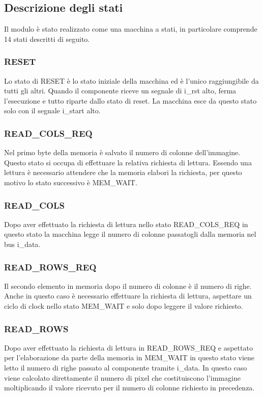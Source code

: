 \documentclass{article}
\begin{document}
\pagebreak

\subsection{Descrizione degli stati}
Il modulo è stato realizzato come una macchina a stati, in particolare comprende 14 stati descritti di seguito.

\subsubsection{RESET}
Lo stato di RESET è lo stato iniziale della macchina ed è l'unico raggiungibile da tutti gli altri. Quando il componente riceve un segnale di i\_rst alto, ferma l'esecuzione e tutto riparte dallo stato di reset. La macchina esce da questo stato solo con il segnale i\_start alto.

\subsubsection{READ\_COLS\_REQ}
Nel primo byte della memoria è salvato il numero di colonne dell'immagine. Questo stato si occupa di effettuare la relativa richiesta di lettura. Essendo una lettura è necessario attendere che la memoria elabori la richiesta, per questo motivo lo stato successivo è MEM\_WAIT.

\subsubsection{READ\_COLS}
Dopo aver effettuato la richiesta di lettura nello stato READ\_COLS\_REQ in questo stato la macchina legge il numero di colonne passatogli dalla memoria nel bus i\_data.

\subsubsection{READ\_ROWS\_REQ}
Il secondo elemento in memoria dopo il numero di colonne è il numero di righe. Anche in questo caso è necessario effettuare la richiesta di lettura, aspettare un ciclo di clock nello stato MEM\_WAIT e solo dopo leggere il valore richiesto.

\subsubsection{READ\_ROWS}
Dopo aver effettuato la richiesta di lettura in READ\_ROWS\_REQ e aspettato per l'elaborazione da parte della memoria in MEM\_WAIT in questo stato viene letto il numero di righe passato al componente tramite i\_data. In questo caso viene calcolato direttamente il numero di pixel che costituiscono l'immagine moltiplicando il valore ricevuto per il numero di colonne richiesto in precedenza.
\end{document}
